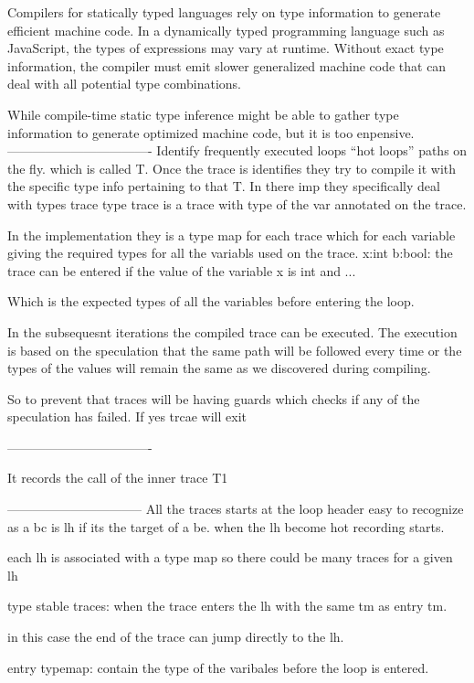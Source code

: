 Compilers for statically typed languages rely on type information to generate
efficient machine code. In a dynamically typed programming language such as
JavaScript, the types of expressions may vary at runtime. 
Without exact type information, the compiler
must emit slower generalized machine code that can deal with all potential type
combinations. 

While compile-time static type inference might be able to
gather type information to generate optimized machine code, 
       but it is too enpensive.
----------------------------------
Identify frequently executed loops ``hot loops'' paths on the fly.
which is called T.
Once the trace is identifies they try to compile it with the specific
type info pertaining to that T.
In there imp they specifically deal with types trace
type trace is a trace with type of the var annotated on the trace.

In the implementation they is a type map for each trace
which for each variable giving the required types for all the variabls used on the trace.
x:int b:bool: the trace can be entered if the value of the variable
x is int and ...

Which is the expected types of all the variables  before entering the loop.

In the subsequesnt iterations the compiled trace can be executed. The
execution is based on the speculation that the same path will be followed
every time or the types of the values will remain the same as we discovered
during compiling.

So to prevent that traces will be having guards which checks
if any of the speculation has failed. If yes trcae will exit

----------------------------------

It records the call of the inner trace T1



--------------------------------
All the traces starts at the loop header
easy to recognize as a bc is lh if its the target of a be.
when the lh become hot recording starts.

each lh is associated with a type map so there could be many
traces for a given lh

type stable traces: when the trace enters the lh with the same tm
as entry tm. 

in this case the end of the trace can jump directly to the lh.

entry typemap: contain the type of the varibales before the loop
is entered.

